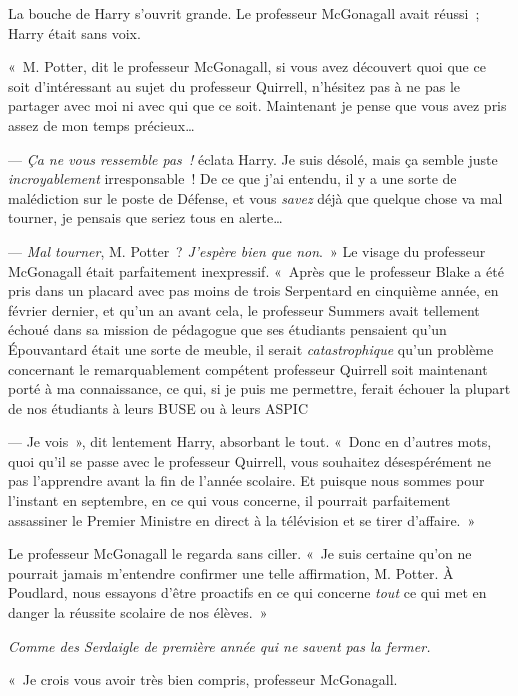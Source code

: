 La bouche de Harry s'ouvrit grande. Le professeur McGonagall avait réussi~; Harry était sans voix.

«~M. Potter, dit le professeur McGonagall, si vous avez découvert quoi que ce soit d'intéressant au sujet du professeur Quirrell, n'hésitez pas à ne pas le partager avec moi ni avec qui que ce soit. Maintenant je pense que vous avez pris assez de mon temps précieux…

--- \emph{Ça ne vous ressemble pas~!} éclata Harry. Je suis désolé, mais ça semble juste \emph{incroyablement} irresponsable~! De ce que j'ai entendu, il y a une sorte de malédiction sur le poste de Défense, et vous \emph{savez} déjà que quelque chose va mal tourner, je pensais que seriez tous en alerte…

--- \emph{Mal tourner}, M. Potter~? \emph{J'espère bien que non}.~» Le visage du professeur McGonagall était parfaitement inexpressif. «~Après que le professeur Blake a été pris dans un placard avec pas moins de trois Serpentard en cinquième année, en février dernier, et qu'un an avant cela, le professeur Summers avait tellement échoué dans sa mission de pédagogue que ses étudiants pensaient qu'un Épouvantard était une sorte de meuble, il serait \emph{catastrophique} qu'un problème concernant le remarquablement compétent professeur Quirrell soit maintenant porté à ma connaissance, ce qui, si je puis me permettre, ferait échouer la plupart de nos étudiants à leurs BUSE ou à leurs ASPIC

--- Je vois~», dit lentement Harry, absorbant le tout. «~Donc en d'autres mots, quoi qu'il se passe avec le professeur Quirrell, vous souhaitez désespérément ne pas l'apprendre avant la fin de l'année scolaire. Et puisque nous sommes pour l'instant en septembre, en ce qui vous concerne, il pourrait parfaitement assassiner le Premier Ministre en direct à la télévision et se tirer d'affaire.~»

Le professeur McGonagall le regarda sans ciller. «~Je suis certaine qu'on ne pourrait jamais m'entendre confirmer une telle affirmation, M. Potter. À Poudlard, nous essayons d'être proactifs en ce qui concerne \emph{tout} ce qui met en danger la réussite scolaire de nos élèves.~»

\emph{Comme des Serdaigle de première année qui ne savent pas la fermer.}

«~Je crois vous avoir très bien compris, professeur McGonagall.


